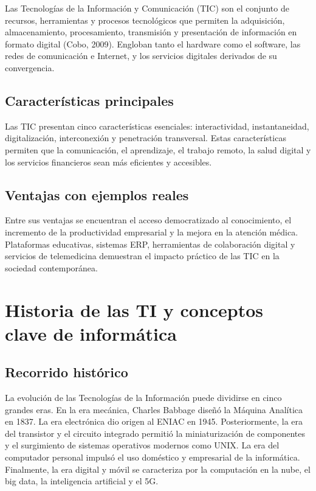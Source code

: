 \documentclass[12pt,a4paper]{article}
\begin{document}
	Las Tecnologías de la Información y Comunicación (TIC) son el conjunto de recursos, herramientas y procesos tecnológicos que permiten la adquisición, almacenamiento, procesamiento, transmisión y presentación de información en formato digital (Cobo, 2009). Engloban tanto el hardware como el software, las redes de comunicación e Internet, y los servicios digitales derivados de su convergencia.
	
	\subsection{Características principales}
	
	Las TIC presentan cinco características esenciales: interactividad, instantaneidad, digitalización, interconexión y penetración transversal. Estas características permiten que la comunicación, el aprendizaje, el trabajo remoto, la salud digital y los servicios financieros sean más eficientes y accesibles.
	
	\subsection{Ventajas con ejemplos reales}
	
	Entre sus ventajas se encuentran el acceso democratizado al conocimiento, el incremento de la productividad empresarial y la mejora en la atención médica. Plataformas educativas, sistemas ERP, herramientas de colaboración digital y servicios de telemedicina demuestran el impacto práctico de las TIC en la sociedad contemporánea.
	
	\section{Historia de las TI y conceptos clave de informática}
	
	\subsection{Recorrido histórico}
	
	La evolución de las Tecnologías de la Información puede dividirse en cinco grandes eras. En la era mecánica, Charles Babbage diseñó la Máquina Analítica en 1837. La era electrónica dio origen al ENIAC en 1945. Posteriormente, la era del transistor y el circuito integrado permitió la miniaturización de componentes y el surgimiento de sistemas operativos modernos como UNIX. La era del computador personal impulsó el uso doméstico y empresarial de la informática. Finalmente, la era digital y móvil se caracteriza por la computación en la nube, el big data, la inteligencia artificial y el 5G.
	
\end{document}
